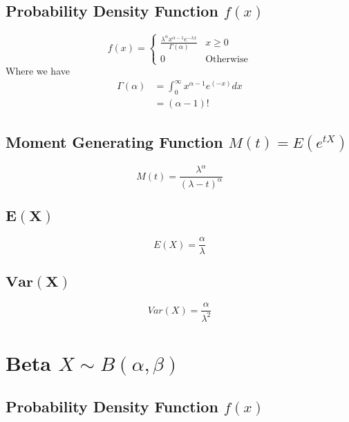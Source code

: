 \documentclass[12pt]{article}
\begin{document}
\subsection{Probability Density Function $f(x)$}

\begin{equation*}
  f(x) =
  \begin{cases}
     \frac{\lambda^{\alpha} x^{\alpha -1} e^{-\lambda x}}{\Gamma(\alpha)} & x \geq 0 \\
     0 & \text{Otherwise}
  \end{cases}
\end{equation*}
Where we have
\begin{align*}
  \Gamma(\alpha) &= \int_{0}^{\infty}x^{\alpha -1}e^(-x) dx \\
                 &= (\alpha -1)!
\end{align*}
\subsection{Moment Generating Function $M(t)=E(e^{tX})$}

\begin{equation*}
    M(t)=\frac{\lambda^{\alpha}}{(\lambda -t)^{\alpha}}
\end{equation*}

\subsection{$\bm{E(X)}$}

\begin{equation*}
  E(X) = \frac{\alpha}{\lambda}
\end{equation*}

\subsection{$\bm{Var(X)}$}

\begin{equation*}
  Var(X)= \frac{\alpha}{\lambda^{2}}
\end{equation*}
\newpage
\section{Beta $X \sim B(\alpha,\beta)$}
\subsection{Probability Density Function $f(x)$}
\end{document}
